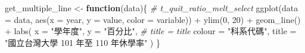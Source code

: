 \documentclass[
]{article}
\newenvironment{Shaded}{\begin{snugshade}}{\end{snugshade}}
\newcommand{\AttributeTok}[1]{\textcolor[rgb]{0.77,0.63,0.00}{#1}}
\newcommand{\CommentTok}[1]{\textcolor[rgb]{0.56,0.35,0.01}{\textit{#1}}}
\newcommand{\ControlFlowTok}[1]{\textcolor[rgb]{0.13,0.29,0.53}{\textbf{#1}}}
\newcommand{\DecValTok}[1]{\textcolor[rgb]{0.00,0.00,0.81}{#1}}
\newcommand{\FunctionTok}[1]{\textcolor[rgb]{0.00,0.00,0.00}{#1}}
\newcommand{\NormalTok}[1]{#1}
\newcommand{\OtherTok}[1]{\textcolor[rgb]{0.56,0.35,0.01}{#1}}
\newcommand{\SpecialCharTok}[1]{\textcolor[rgb]{0.00,0.00,0.00}{#1}}
\newcommand{\StringTok}[1]{\textcolor[rgb]{0.31,0.60,0.02}{#1}}
\begin{document}
\begin{Shaded}
\begin{Highlighting}[]
\NormalTok{get\_multiple\_line }\OtherTok{\textless{}{-}} \ControlFlowTok{function}\NormalTok{(data)\{}
    \CommentTok{\# t\_quit\_ratio\_melt\_select}
    \FunctionTok{ggplot}\NormalTok{(}\AttributeTok{data =}\NormalTok{ data, }\FunctionTok{aes}\NormalTok{(}\AttributeTok{x =}\NormalTok{ year, }\AttributeTok{y =}\NormalTok{ value, }\AttributeTok{color =}\NormalTok{ variable)) }\SpecialCharTok{+}
        \FunctionTok{ylim}\NormalTok{(}\DecValTok{0}\NormalTok{, }\DecValTok{20}\NormalTok{) }\SpecialCharTok{+} 
        \FunctionTok{geom\_line}\NormalTok{() }\SpecialCharTok{+} 
        \FunctionTok{labs}\NormalTok{(}
            \AttributeTok{x =} \StringTok{"學年度"}\NormalTok{,}
            \AttributeTok{y =} \StringTok{"百分比"}\NormalTok{,}
            \CommentTok{\# title = title}
            \AttributeTok{colour =} \StringTok{"科系代碼"}\NormalTok{,}
            \AttributeTok{title =} \StringTok{"國立台灣大學 101 年至 110 年休學率"}
\NormalTok{            ) }
\NormalTok{\}}
\end{Highlighting}
\end{Shaded}
\end{document}
